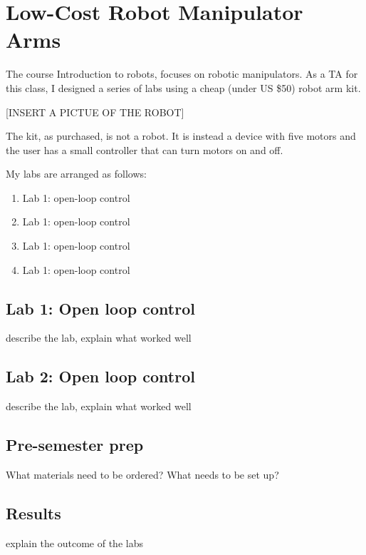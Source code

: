 \chapter[Low-Cost Robot Manipulator Arms]{Low-Cost Robot Manipulator Arms}\label{chap-lowcostarms}

The course Introduction to robots, focuses on robotic manipulators.  As a TA for this class, I designed a series of labs using a cheap (under US \$50) robot arm kit.

[INSERT A PICTUE OF THE ROBOT]

The kit, as purchased, is not a robot.  It is instead a device with five motors and the user has a small controller that can turn motors on and off.

My labs are arranged as follows:

\begin{enumerate}
\item  Lab 1:  open-loop control
\item  Lab 1:  open-loop control
\item  Lab 1:  open-loop control
\item  Lab 1:  open-loop control
\end{enumerate}



\section{Lab 1: Open loop control}

describe the lab, explain what worked well


\section{Lab 2: Open loop control}

describe the lab, explain what worked well

\section{Pre-semester prep}

What materials need to be ordered?  What needs to be set up?


\section{Results}

explain the outcome of the labs